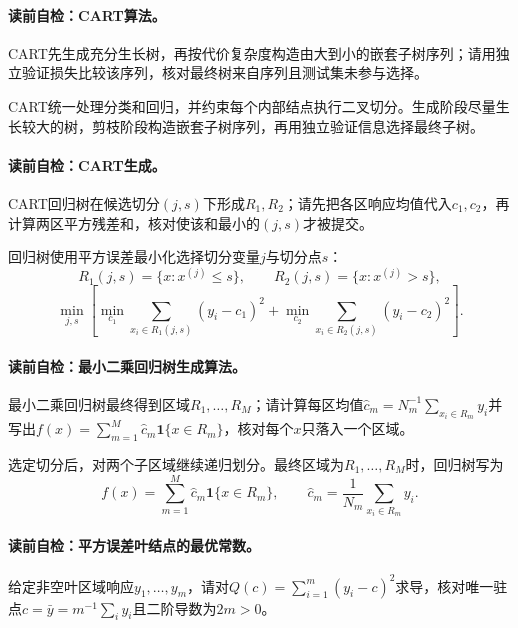 \paragraph{读前自检：CART算法。}CART先生成充分生长树，再按代价复杂度构造由大到小的嵌套子树序列；请用独立验证损失比较该序列，核对最终树来自序列且测试集未参与选择。\par

CART统一处理分类和回归，并约束每个内部结点执行二叉切分。生成阶段尽量生长较大的树，剪枝阶段构造嵌套子树序列，再用独立验证信息选择最终子树。

\paragraph{读前自检：CART生成。}CART回归树在候选切分$(j,s)$下形成$R_1,R_2$；请先把各区响应均值代入$c_1,c_2$，再计算两区平方残差和，核对使该和最小的$(j,s)$才被提交。\par

回归树使用平方误差最小化选择切分变量$j$与切分点$s$：
\[
R_1(j,s)=\{x:x^{(j)}\le s\},\qquad
R_2(j,s)=\{x:x^{(j)}>s\},
\]
\[
\min_{j,s}\left[
\min_{c_1}\sum_{x_i\in R_1(j,s)}(y_i-c_1)^2+
\min_{c_2}\sum_{x_i\in R_2(j,s)}(y_i-c_2)^2
\right].
\]

\paragraph{读前自检：最小二乘回归树生成算法。}最小二乘回归树最终得到区域$R_1,\ldots,R_M$；请计算每区均值$\widehat c_m=N_m^{-1}\sum_{x_i\in R_m}y_i$并写出$f(x)=\sum_{m=1}^M\widehat c_m\mathbf1\{x\in R_m\}$，核对每个$x$只落入一个区域。\par

选定切分后，对两个子区域继续递归划分。最终区域为$R_1,\ldots,R_M$时，回归树写为
\[
f(x)=\sum_{m=1}^{M}\widehat c_m\mathbf1\{x\in R_m\},\qquad
\widehat c_m=\frac1{N_m}\sum_{x_i\in R_m}y_i.
\]

\paragraph{读前自检：平方误差叶结点的最优常数。}给定非空叶区域响应$y_1,\ldots,y_m$，请对$Q(c)=\sum_{i=1}^m(y_i-c)^2$求导，核对唯一驻点$c=\bar y=m^{-1}\sum_i y_i$且二阶导数为$2m>0$。\par

